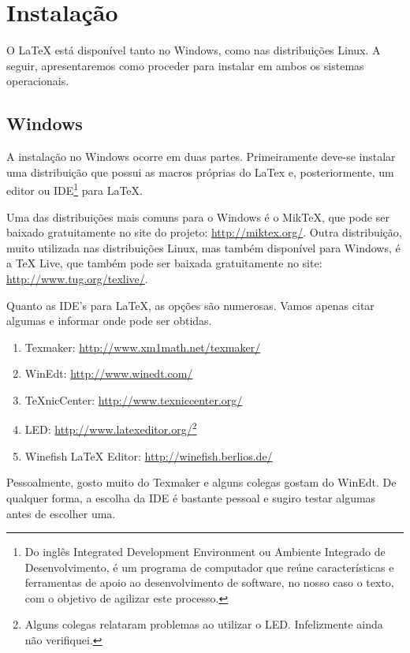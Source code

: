 % 
% 
% 
% 
% 
\chapter{Instalação} \label{sch:latex:install}
O LaTeX está disponível tanto no Windows, como nas distribuições Linux. A seguir, apresentaremos como proceder para instalar em ambos os sistemas operacionais.

\section{Windows}

A instalação no Windows ocorre em duas partes. Primeiramente deve-se instalar uma distribuição que possui as macros próprias do LaTex e, posteriormente, um editor ou IDE\footnote{Do inglês Integrated Development Environment ou Ambiente Integrado de Desenvolvimento, é um programa de computador que reúne características e ferramentas de apoio ao desenvolvimento de software, no nosso caso o texto, com o objetivo de agilizar este processo.} para LaTeX.

Uma das distribuições mais comuns para o Windows é o MikTeX, que pode ser baixado gratuitamente no site do projeto: \url{http://miktex.org/}. Outra distribuição, muito utilizada nas distribuições Linux, mas também disponível para Windows, é a TeX Live, que também pode ser baixada gratuitamente no site: \url{http://www.tug.org/texlive/}.

Quanto as IDE's para LaTeX, as opções são numerosas. Vamos apenas citar algumas e informar onde pode ser obtidas.
\begin{enumerate}
    \item Texmaker: \url{http://www.xm1math.net/texmaker/}
    \item WinEdt: \url{http://www.winedt.com/}
    \item TeXnicCenter: \url{http://www.texniccenter.org/}
    \item LED: \url{http://www.latexeditor.org/}\footnote{Alguns colegas relataram problemas ao utilizar o LED. Infelizmente ainda não verifiquei.}
    \item Winefish LaTeX Editor: \url{http://winefish.berlios.de/}
\end{enumerate}
Pessoalmente, gosto muito do Texmaker e alguns colegas gostam do WinEdt. De qualquer forma, a escolha da IDE é bastante pessoal e sugiro testar algumas antes de escolher uma.

